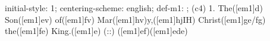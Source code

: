 initial-style: 1;
centering-scheme: english;
def-m1: \grealign;
(c4) 1. The([em1]d) Son([em1]ev) of([em1]fv) Mar([em1]hv)y,([em1]hjIH) Christ([em1]ge/fg) the([em1]fe) King.([em1]e) (::) ([em1]ef)([em1]ede)